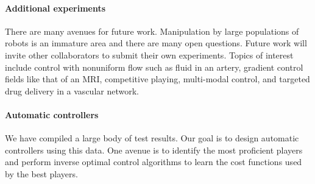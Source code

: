 \paragraph{Additional experiments}
There are many avenues for future work.  Manipulation by large populations of robots is an immature area and there are many open questions. Future work will invite other collaborators to submit their own experiments.
Topics of interest include  control with nonuniform flow such as fluid in an artery, gradient control fields like that of an MRI, competitive playing, multi-modal control, and targeted drug delivery in a vascular network.

\paragraph{Automatic controllers}
We have compiled a large body of test results.  Our goal is to design automatic controllers using this data. One avenue is to identify the most proficient players and perform inverse optimal control algorithms to learn the cost functions used by the best players.  


%

